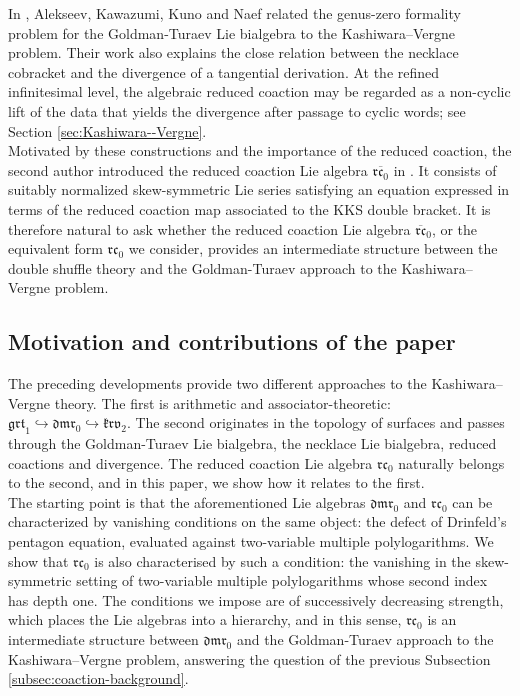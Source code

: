 \documentclass[a4paper,fleqn]{cas-sc}
\newcommand{\grt}{\mathfrak{grt}}
\newcommand{\rc}{\mathfrak{rc}}
\newcommand{\dmr}{\mathfrak{dmr}}
\newcommand{\krv}{\mathfrak{krv}}
\begin{document}
In \cite{GTgenus0}, Alekseev, Kawazumi, Kuno and Naef related the genus-zero formality
problem for the Goldman-Turaev Lie bialgebra to the
Kashiwara--Vergne problem. Their work also explains the
close relation between the necklace cobracket and the divergence of a
tangential derivation. At the refined infinitesimal level, the algebraic reduced
coaction may be regarded as a non-cyclic lift of the data that yields
the divergence after passage to cyclic words; see Section \ref{sec:Kashiwara--Vergne}. \\

Motivated by these constructions and the importance of the reduced coaction, the second author introduced the reduced coaction Lie algebra $\overline{\mathfrak{rc}_0}$ in \cite{Ren2025}. It consists of suitably normalized skew-symmetric Lie series satisfying an equation expressed in terms
of the reduced coaction map associated to the KKS double bracket. It is therefore natural to ask
whether the reduced coaction Lie algebra
$\overline{\rc}_0$, or the equivalent form $\rc_0$ we consider, provides an %
intermediate structure
between the double shuffle theory and the Goldman-Turaev approach to the
Kashiwara--Vergne problem.

\subsection{Motivation and contributions of the paper}

The preceding developments provide two different approaches to the
Kashiwara--Vergne theory. The first is arithmetic and
associator-theoretic: $\grt_1 \hookrightarrow \dmr_0 \hookrightarrow \krv_2.$ 
The second originates in the topology of surfaces and passes through
the Goldman-Turaev Lie bialgebra, the necklace Lie bialgebra,
reduced coactions and divergence. The reduced coaction Lie algebra $\rc_0$ naturally belongs to the second, and in this paper, we show how it relates to the first. \\

The starting point is that the aforementioned Lie algebras $\dmr_0$ and $\rc_0$ can be characterized by vanishing conditions on the same object: the defect of Drinfeld's pentagon equation, evaluated against two-variable multiple polylogarithms. We show that $\rc_0$ is also characterised by such a condition: the vanishing in the skew-symmetric setting of two-variable multiple polylogarithms whose second index has depth one.
The conditions we impose are of successively decreasing strength, which places the Lie algebras into a hierarchy, and in this sense, $\rc_0$ is an intermediate structure between $\dmr_0$ and the Goldman-Turaev approach to the Kashiwara--Vergne problem, answering the question of the previous Subsection \ref{subsec:coaction-background}. 
\end{document}
